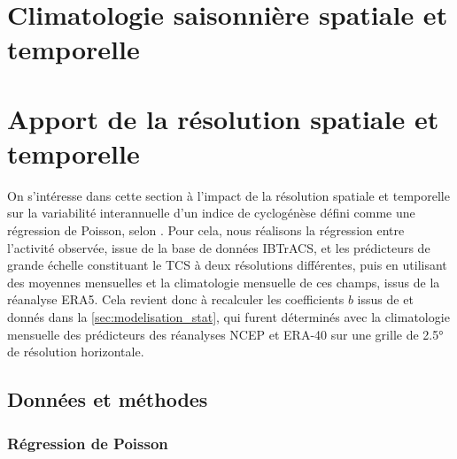 \documentclass[../main.tex]{subfiles}
\begin{document}
\section{Climatologie saisonnière spatiale et temporelle}

\section{Apport de la résolution spatiale et temporelle}

On s'intéresse dans cette section à l'impact de la résolution spatiale et temporelle sur la variabilité interannuelle d'un indice de cyclogénèse défini comme
une régression de Poisson, selon \textcite{tippett_poisson_2011}. Pour cela, nous réalisons la régression entre l'activité observée, issue de la base de données
IBTrACS, et les prédicteurs de grande échelle constituant le TCS à deux résolutions différentes, puis en utilisant des moyennes mensuelles et la climatologie
mensuelle de ces champs, issus de la réanalyse ERA5. Cela revient donc à recalculer les coefficients $b$ issus de \textcite{tippett_poisson_2011} et donnés
dans la \cref{sec:modelisation_stat}, qui furent déterminés avec la climatologie mensuelle des prédicteurs des réanalyses NCEP
\parencite{kalnay_ncep_1996,kistler_ncep_2001} et ERA-40 \parencite{uppala_era40_2005} sur une grille de \ang{2.5} de résolution horizontale.

\subsection{Données et méthodes}

\subsubsection*{Régression de Poisson}\label{sec:regression_poisson}
\end{document}
